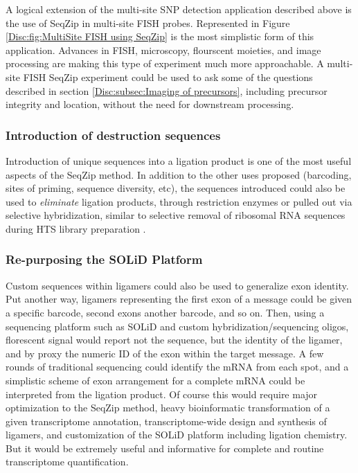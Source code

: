       A logical extension of the multi-site SNP detection application described above is the use of SeqZip in multi-site FISH probes. Represented in Figure \ref{Disc:fig:MultiSite FISH using SeqZip} is the most simplistic form of this application. Advances in FISH, microscopy, flourscent moieties, and image processing are making this type of experiment much more approachable. A multi-site FISH SeqZip experiment could be used to ask some of the questions described in section \ref{Disc:subsec:Imaging of precursors}, including precursor integrity and location, without the need for downstream processing.

    \subsubsection{Introduction of destruction sequences}
      \label{Disc:subsubsec:Intro of Desctruction Sequences}

      Introduction of unique sequences into a ligation product is one of the most useful aspects of the SeqZip method. In addition to the other uses proposed (barcoding, sites of priming, sequence diversity, etc), the sequences introduced could also be used to \textit{eliminate} ligation products, through restriction enzymes or pulled out via selective hybridization, similar to selective removal of ribosomal RNA sequences during HTS library preparation \citep{Chen2011a}.

    \subsubsection{Re-purposing the SOLiD Platform}
      \label{Disc:subsubsec:SOLiD Platform for SeqZip}

      Custom sequences within ligamers could also be used to generalize exon identity. Put another way, ligamers representing the first exon of a message could be given a specific barcode, second exons another barcode, and so on. Then, using a sequencing platform such as SOLiD and custom hybridization/sequencing oligos, florescent signal would report not the sequence, but the identity of the ligamer, and by proxy the numeric ID of the exon within the target message. A few rounds of traditional sequencing could identify the mRNA from each spot, and a simplistic scheme of exon arrangement for a complete mRNA could be interpreted from the ligation product. Of course this would require major optimization to the SeqZip method, heavy bioinformatic transformation of a given transcriptome annotation, transcriptome-wide design and synthesis of ligamers, and customization of the SOLiD platform including ligation chemistry. But it would be extremely useful and informative for complete and routine transcriptome quantification.

